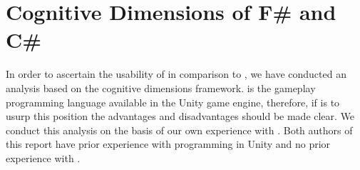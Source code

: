 \section{Cognitive Dimensions of F\# and C\#}
In order to ascertain the usability of \fs in comparison to \cs, we have conducted an analysis based on the cognitive dimensions framework\cite{green1996usability}. \cs is the gameplay programming language available in the Unity game engine, therefore, if \fs is to usurp this position the advantages and disadvantages should be made clear. We conduct this analysis on the basis of our own experience with \fs. Both authors of this report have prior experience with \cs programming in Unity and no prior experience with \fs.














